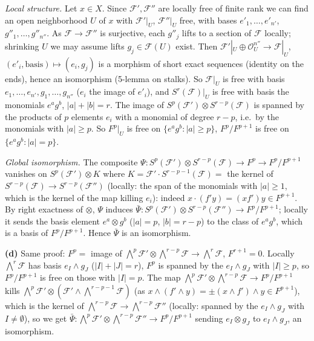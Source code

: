 \documentclass[11pt]{article}
\begin{document}
\emph{Local structure.} Let $x\in X$. Since $\mathcal F',\mathcal F''$ are locally free of finite rank we can find an open neighborhood $U$ of $x$ with $\mathcal F'|_U$, $\mathcal F''|_U$ free, with bases $e'_1,\dots,e'_{n'}$, $g''_1,\dots,g''_{n''}$. As $\mathcal F\to\mathcal F''$ is surjective, each $g''_j$ lifts to a section of $\mathcal F$ locally; shrinking $U$ we may assume lifts $g_j\in\mathcal F(U)$ exist. Then $\mathcal F'|_U\oplus\mathcal O_U^{n''}\to\mathcal F|_U$, $(e'_i,\text{basis})\mapsto(e_i,g_j)$ is a morphism of short exact sequences (identity on the ends), hence an isomorphism (5-lemma on stalks). So $\mathcal F|_U$ is free with basis $e_1,\dots,e_{n'},g_1,\dots,g_{n''}$ ($e_i$ the image of $e'_i$), and $S^r(\mathcal F)|_U$ is free with basis the monomials $e^ag^b$, $|a|+|b|=r$. The image of $S^p(\mathcal F')\otimes S^{r-p}(\mathcal F)$ is spanned by the products of $p$ elements $e_i$ with a monomial of degree $r-p$, i.e.\ by the monomials with $|a|\ge p$. So $F^p|_U$ is free on $\{e^ag^b:|a|\ge p\}$, $F^p/F^{p+1}$ is free on $\{e^ag^b:|a|=p\}$.

\emph{Global isomorphism.} The composite $\Psi:S^p(\mathcal F')\otimes S^{r-p}(\mathcal F)\to F^p\to F^p/F^{p+1}$ vanishes on $S^p(\mathcal F')\otimes K$ where $K=\mathcal F'\cdot S^{r-p-1}(\mathcal F)=$ the kernel of $S^{r-p}(\mathcal F)\to S^{r-p}(\mathcal F'')$ (locally: the span of the monomials with $|a|\ge1$, which is the kernel of the map killing $e_i$): indeed $x\cdot(f'y)=(xf')y\in F^{p+1}$. By right exactness of $\otimes$, $\Psi$ induces $\bar\Psi:S^p(\mathcal F')\otimes S^{r-p}(\mathcal F'')\to F^p/F^{p+1}$; locally it sends the basis element $e^a\otimes g^b$ ($|a|=p$, $|b|=r-p$) to the class of $e^ag^b$, which is a basis of $F^p/F^{p+1}$. Hence $\bar\Psi$ is an isomorphism.

\textbf{(d)} Same proof: $F^p=$ image of $\bigwedge^p\mathcal F'\otimes\bigwedge^{r-p}\mathcal F\to\bigwedge^r\mathcal F$, $F^{r+1}=0$. Locally $\bigwedge^r\mathcal F$ has basis $e_I\wedge g_J$ ($|I|+|J|=r$), $F^p$ is spanned by the $e_I\wedge g_J$ with $|I|\ge p$, so $F^p/F^{p+1}$ is free on those with $|I|=p$. The map $\bigwedge^p\mathcal F'\otimes\bigwedge^{r-p}\mathcal F\to F^p/F^{p+1}$ kills $\bigwedge^p\mathcal F'\otimes(\mathcal F'\wedge\bigwedge^{r-p-1}\mathcal F)$ (as $x\wedge(f'\wedge y)=\pm(x\wedge f')\wedge y\in F^{p+1}$), which is the kernel of $\bigwedge^{r-p}\mathcal F\to\bigwedge^{r-p}\mathcal F''$ (locally: spanned by the $e_I\wedge g_J$ with $I\ne\emptyset$), so we get $\bar\Psi:\bigwedge^p\mathcal F'\otimes\bigwedge^{r-p}\mathcal F''\to F^p/F^{p+1}$ sending $e_I\otimes g_J$ to $e_I\wedge g_J$, an isomorphism.
\end{document}
